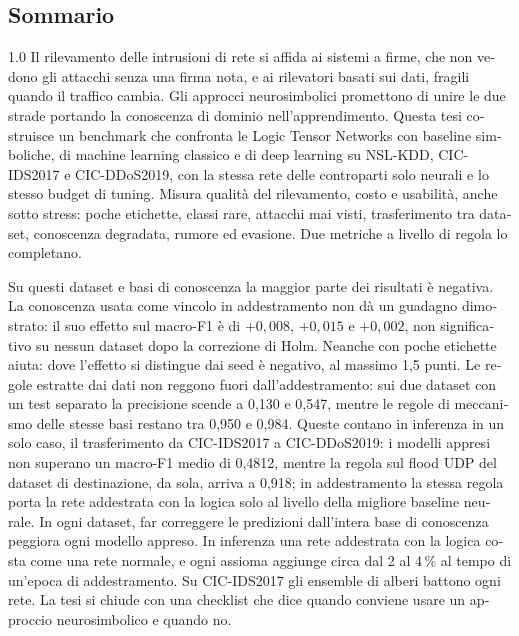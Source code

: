 \begin{otherlanguage}{italian}
\chapter*{Sommario}

\begin{spacing}{1.0}
Il rilevamento delle intrusioni di rete si affida ai sistemi a firme, che non vedono gli attacchi
senza una firma nota, e ai rilevatori basati sui dati, fragili quando il traffico cambia. Gli
approcci neurosimbolici promettono di unire le due strade portando la conoscenza di dominio
nell'apprendimento. Questa tesi costruisce un benchmark che confronta le Logic Tensor Networks con
baseline simboliche, di machine learning classico e di deep learning su NSL-KDD, CIC-IDS2017 e
CIC-DDoS2019, con la stessa rete delle controparti solo neurali e lo stesso budget di tuning. Misura
qualità del rilevamento, costo e usabilità, anche sotto stress: poche etichette, classi rare,
attacchi mai visti, trasferimento tra dataset, conoscenza degradata, rumore ed evasione. Due
metriche a livello di regola lo completano.

Su questi dataset e basi di conoscenza la maggior parte dei risultati è negativa. La conoscenza
usata come vincolo in addestramento non dà un guadagno dimostrato: il suo effetto sul macro-F1 è di
$+0{,}008$, $+0{,}015$ e $+0{,}002$, non significativo su nessun dataset dopo la correzione di Holm.
Neanche con poche etichette aiuta: dove l'effetto si distingue dai seed è negativo, al massimo 1,5
punti. Le regole estratte dai dati non reggono fuori dall'addestramento: sui due dataset con un test
separato la precisione scende a 0,130 e 0,547, mentre le regole di meccanismo delle stesse basi
restano tra 0,950 e 0,984. Queste contano in inferenza in un solo caso, il trasferimento da
CIC-IDS2017 a CIC-DDoS2019: i modelli appresi non superano un macro-F1 medio di 0,4812, mentre la regola
sul flood UDP del dataset di destinazione, da sola, arriva a 0,918; in addestramento la stessa
regola porta la rete addestrata con la logica solo al livello della migliore baseline neurale. In ogni dataset, far correggere
le predizioni dall'intera base di conoscenza peggiora ogni modello appreso. In inferenza una rete
addestrata con la logica costa come una rete normale, e ogni assioma aggiunge circa dal 2 al 4\,\% al
tempo di un'epoca di addestramento. Su CIC-IDS2017 gli ensemble di alberi battono ogni rete. La
tesi si chiude con una checklist che dice quando conviene usare un approccio neurosimbolico e quando
no.
\end{spacing}
\end{otherlanguage}
